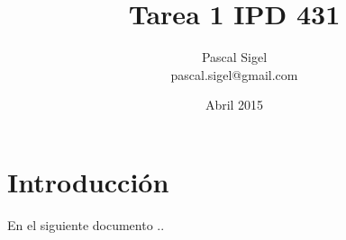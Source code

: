 \documentclass[11pt,twoside,letterpaper]{article}
\begin{document}
	\title{Tarea 1 IPD 431}
	\author{Pascal Sigel\\pascal.sigel@gmail.com}
	\date{Abril 2015}
	\maketitle
	\newpage
	
	\section{Introducción}
	En el siguiente documento ..
	
	
	
	
\end{document}
